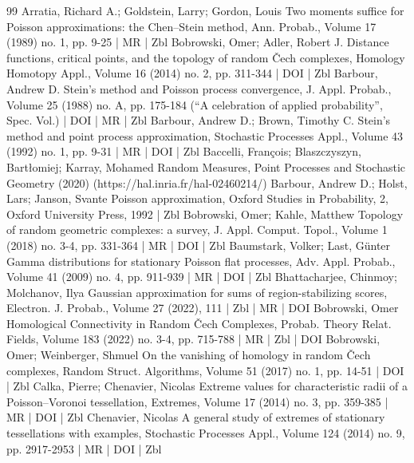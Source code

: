 \documentclass[10pt]{amsart}
\theoremstyle{definition}\newtheorem{defi}[theo]{Definition}\newtheorem{rema}[theo]{Remark}\newtheorem{exam}[theo]{Example}\newtheorem{exem}[theo]{Example}\newtheorem{nota}[theo]{Notation}
\begin{document}
\vspace{25pt}


\begin{thebibliography}{99}
Arratia, Richard A.; Goldstein, Larry; Gordon, Louis Two moments suffice for Poisson approximations: the Chen–Stein method, Ann. Probab., Volume 17 (1989) no. 1, pp. 9-25 | MR | Zbl
Bobrowski, Omer; Adler, Robert J. Distance functions, critical points, and the topology of random Čech complexes, Homology Homotopy Appl., Volume 16 (2014) no. 2, pp. 311-344 | DOI | Zbl
Barbour, Andrew D. Stein’s method and Poisson process convergence, J. Appl. Probab., Volume 25 (1988) no. A, pp. 175-184 (“A celebration of applied probability”, Spec. Vol.) | DOI | MR | Zbl
Barbour, Andrew D.; Brown, Timothy C. Stein’s method and point process approximation, Stochastic Processes Appl., Volume 43 (1992) no. 1, pp. 9-31 | MR | DOI | Zbl
Baccelli, François; Blaszczyszyn, Bartłomiej; Karray, Mohamed Random Measures, Point Processes and Stochastic Geometry (2020) (https://hal.inria.fr/hal-02460214/)
Barbour, Andrew D.; Holst, Lars; Janson, Svante Poisson approximation, Oxford Studies in Probability, 2, Oxford University Press, 1992 | Zbl
Bobrowski, Omer; Kahle, Matthew Topology of random geometric complexes: a survey, J. Appl. Comput. Topol., Volume 1 (2018) no. 3-4, pp. 331-364 | MR | DOI | Zbl
Baumstark, Volker; Last, Günter Gamma distributions for stationary Poisson flat processes, Adv. Appl. Probab., Volume 41 (2009) no. 4, pp. 911-939 | MR | DOI | Zbl
Bhattacharjee, Chinmoy; Molchanov, Ilya Gaussian approximation for sums of region-stabilizing scores, Electron. J. Probab., Volume 27 (2022), 111 | Zbl | MR | DOI
Bobrowski, Omer Homological Connectivity in Random Čech Complexes, Probab. Theory Relat. Fields, Volume 183 (2022) no. 3-4, pp. 715-788 | MR | Zbl | DOI
Bobrowski, Omer; Weinberger, Shmuel On the vanishing of homology in random Čech complexes, Random Struct. Algorithms, Volume 51 (2017) no. 1, pp. 14-51 | DOI | Zbl
Calka, Pierre; Chenavier, Nicolas Extreme values for characteristic radii of a Poisson–Voronoi tessellation, Extremes, Volume 17 (2014) no. 3, pp. 359-385 | MR | DOI | Zbl
Chenavier, Nicolas A general study of extremes of stationary tessellations with examples, Stochastic Processes Appl., Volume 124 (2014) no. 9, pp. 2917-2953 | MR | DOI | Zbl

\end{thebibliography}
\end{document}
